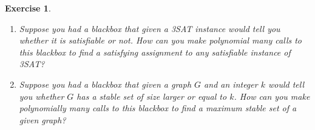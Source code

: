 \documentclass[12pt]{article}
\theoremstyle{colon}
\newtheorem{exercise}{Exercise}
\begin{document}
\clearpage

\begin{exercise}
  \leavevmode
  \begin{enumerate}[label=\arabic*)]
    \item Suppose you had a blackbox that given a 3SAT instance would tell you whether it is satisfiable or not. How can you make polynomial many calls to this blackbox to find a satisfying assignment to any satisfiable instance of 3SAT?

    \item Suppose you had a blackbox that given a graph $G$ and an integer $k$ would tell you whether $G$ has a stable set of size larger or equal to $k$. How can you make polynomially many calls to this blackbox to find a maximum stable set of a given graph?
  \end{enumerate}
\end{exercise}
\end{document}

